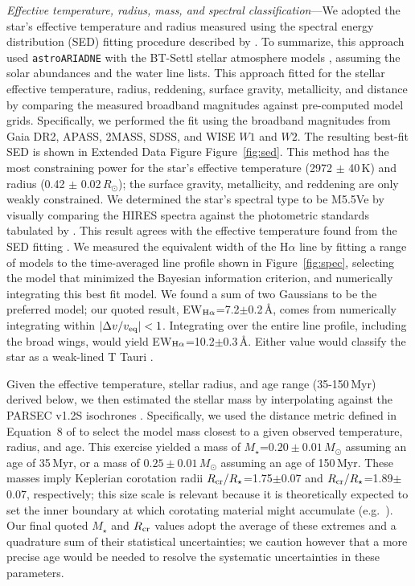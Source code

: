 \documentclass{nature3}
\begin{document}
\begin{methods}
{\it Effective temperature, radius, mass, and spectral
classification}---We adopted the star's effective temperature and
radius measured using the spectral energy distribution (SED) fitting
procedure described by \cite{Bouma2024}.  To summarize, this approach
used \texttt{astroARIADNE} \cite{Vines2022} with the BT-Settl stellar
atmosphere models \cite{Allard2012}, assuming the \cite{Asplund2009}
solar abundances and the \cite{Barber2006} water line lists.  This
approach fitted for the stellar effective temperature, radius,
reddening, surface gravity, metallicity, and distance by comparing the
measured broadband magnitudes against pre-computed model grids.
Specifically, we performed the fit using the broadband magnitudes from
Gaia DR2, APASS, 2MASS, SDSS, and WISE $W1$ and $W2$.  The resulting
best-fit SED is shown in Extended Data Figure Figure~\ref{fig:sed}.  This method has the
most constraining power for the star's effective temperature (2972
$\pm$ 40\,K) and radius (0.42 $\pm$ 0.02\,$R_\odot$); the surface
gravity, metallicity, and reddening are only weakly constrained.  We
determined the star's spectral type to be M5.5Ve by visually comparing
the HIRES spectra against the photometric standards tabulated by
\cite{Bochanski2007}.   This result agrees with the effective
temperature found from the SED fitting \cite{Pecaut2013}.  We measured
the equivalent width of the H$\alpha$ line by fitting a range of
models to the time-averaged line profile shown in
Figure~\ref{fig:spec}, selecting the model that minimized the Bayesian
information criterion, and numerically integrating this best fit model.  
We found a sum of two Gaussians to be the preferred model; our quoted
result, EW$_{{\rm H}\alpha}$=7.2$\pm$0.2\,\AA, comes from numerically
integrating within $|\Delta v/v_{\rm eq}|<1$.  Integrating over the
entire line profile, including the broad wings, would yield EW$_{{\rm
H}\alpha}$=10.2$\pm$0.3\,\AA. Either value would classify the star as
a weak-lined T Tauri \cite{Briceno2019}.

Given the effective temperature, stellar radius, and age range
(35-150\,Myr) derived below, we then estimated the stellar mass by
interpolating against the PARSEC v1.2S isochrones \cite{Chen2014}.
Specifically, we used the distance metric defined in Equation~8 of
\cite{Bouma2024} to select the model mass closest to a given observed
temperature, radius, and age.  This exercise yielded a mass of
$M_\star$=$0.20\pm0.01$\,$M_\odot$ assuming an age of 35\,Myr, or a
mass of $0.25\pm0.01$\,$M_\odot$ assuming an age of 150\,Myr.  These
masses imply Keplerian corotation radii $R_{\rm
cr}/R_\star$=1.75$\pm$0.07 and $R_{\rm cr}/R_\star$=1.89$\pm$0.07,
respectively; this size scale is relevant because it is theoretically
expected to set the inner boundary at which corotating material might
accumulate (e.g.~\cite{Townsend2005,Daley-Yates2024}).  Our final
quoted $M_\star$ and $R_{\rm cr}$ values adopt the average of these
extremes and a quadrature sum of their statistical uncertainties; we
caution however that a more precise age would be needed to resolve the
systematic uncertainties in these parameters.



\end{methods}
\end{document}
